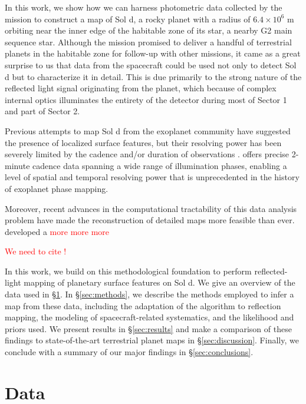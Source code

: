 \documentclass[modern]{aastex62}
\newcommand{\todo}[1]{\textcolor{red}{#1}}
\begin{document}
In this work, we show how we can harness photometric data collected by the \TESS mission
to construct a map of Sol d, a rocky planet ‎with a radius of $6.4\times 10^6$ m
orbiting near the inner edge of the habitable zone of its star, a nearby G2 main sequence
star. Although the \TESS mission promised to deliver a handful of terrestrial planets in 
the habitable zone for follow-up with other missions, it came as a great surprise
to us that data from the spacecraft could be used not only to detect Sol d but to
characterize it in detail. This is due primarily to the strong nature of the reflected
light signal originating from the planet, which 
because of complex internal optics illuminates the entirety of the \TESS detector 
during most of Sector 1 and part of Sector 2.

Previous attempts to map Sol d from the exoplanet community have suggested 
the presence of localized surface features, but their resolving power has been 
severely limited by the cadence and/or duration of observations \citep{Cowan2009,Jiang2018}. 
\TESS offers precise 2-minute cadence data spanning a wide range of illumination 
phases, enabling a level of spatial and temporal resolving power that is 
unprecedented in the history of exoplanet phase mapping. 

Moreover, recent advances in the computational tractability of this data analysis problem 
have made the reconstruction of detailed maps more feasible than ever. 
\cite{Luger2019} developed a \todo{more more more}
\cite{Haggard2018}



\todo{We need to cite \cite{Sagan1993}!}


In this work, we build on this methodological foundation to perform 
reflected-light mapping of planetary surface features on Sol d. 
We give an overview of the \TESS data used in \S\ref{sec:data}. 
In \S\ref{sec:methods}, we describe the methods employed to infer a map 
from these data, including the adaptation of the \starry algorithm to reflection 
mapping, the modeling of spacecraft-related systematics, and the likelihood and 
priors used. 
We present results in \S\ref{sec:results} and make a comparison of these 
findings to state-of-the-art terrestrial planet maps in 
\S\ref{sec:discussion}. 
Finally, we conclude with a summary of our major findings in \S\ref{sec:conclusions}.

\section{Data}
\label{sec:data}
\end{document}

